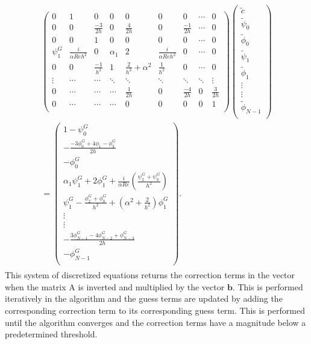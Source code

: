 \documentclass[a4paper, 12pt, twoside, openright]{article}
\numberwithin{equation}{section}
\begin{document}
\begin{align}
\begin{split}
\begin{pmatrix}
0 & 1 & 0 & 0 & 0 & 0 & 0 & \cdots & 0 \\
0 & 0 & \frac{-3}{2h} & 0 & \frac{4}{2h} & 0 & \frac{-1}{2h} & \cdots & 0 \\
0 & 0 & 1 & 0 & 0 & 0 & 0 & \cdots & 0 \\
\psi^G_1 & \frac{i}{\alpha Reh^2} & 0 & \alpha_1 & 2 & \frac{i}{\alpha Reh^2} & 0 & \cdots & 0 \\
0 & 0 & \frac{-1}{h^2} & 1 & \frac{2}{h^2}+\alpha^2 & \frac{1}{h^2} & 0 & \cdots & 0 \\
\vdots & \cdots & \cdots & \ddots & \ddots & \ddots & \ddots & \ddots & \vdots\\ 
0 & \cdots & \cdots & \cdots & \frac{1}{2h} & 0 & \frac{-4}{2h}& 0 & \frac{3}{2h} \\
0 & \cdots & \cdots & \cdots & 0 & 0 & 0 & 0 & 1\\
\end{pmatrix} 
\begin{pmatrix}
\tilde c \\
\tilde \psi_0 \\
\tilde \phi_0 \\
\tilde \psi_1 \\
\tilde \phi_1 \\
\vdots \\
\vdots \\
\tilde \phi_{N-1} \\ 
\end{pmatrix}
\\=
\begin{pmatrix}
1-\psi^G_0 \\
- \frac{-3\phi^G_0 + 4\phi_1-\phi^G_3}{2h}\\
- \phi^{G}_0 \\
\alpha_1\psi^{G}_1 + 2\phi^{G}_1 + \frac{i}{\alpha Re}\left(\frac{ \psi^{G}_2+\psi^{G}_0}{h^2} \right) \\
\psi^{G}_1 - \frac{\phi^{G}_{2} + \phi^{G}_{0}}{h^2}+\left(\alpha^2+\frac{2}{h^2}\right)\phi^{G}_1 \\
\vdots \\
\vdots \\
-\frac{3\phi^{G}_{N-1} - 4\phi^{G}_{N-2}+\phi^{G}_{N-3}}{2h} \\
- \phi^{G}_{N-1}\\
\end{pmatrix}.
\end{split}
\end{align}
This system of discretized equations returns the correction terms in the vector when the matrix $\mathrm{A}$ is inverted and multiplied by the vector $\mathbf{b}$. This is performed iteratively in the algorithm and the guess terms are updated by adding the corresponding correction term to its corresponding guess term. This is performed until the algorithm converges and the correction terms have a magnitude below a predetermined threshold. %
  
\end{document}
